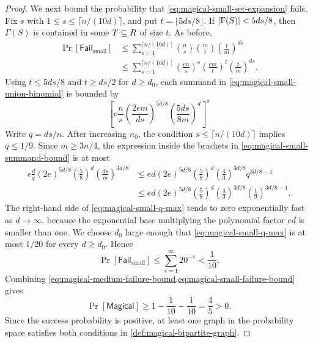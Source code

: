 \begin{proof}
	We next bound the probability that \cref{eq:magical-small-set-expansion} fails. Fix \(s\) with \(1\leq s\leq \lceil n/(10d)\rceil\), and put \(t=\lfloor 5ds/8\rfloor\). If \(\lvert\Gamma(S)\rvert<5ds/8\), then \(\Gamma(S)\) is contained in some \(T\subseteq R\) of size \(t\). As before,
	\begin{align}
		\Pr[\mathsf{Fail}_{\mathrm{small}}]
		 & \leq \sum_{s=1}^{\lceil n/(10d)\rceil}\binom{n}{s}\binom{m}{t}\left(\frac{t}{m}\right)^{ds} \label{eq:magical-small-union-raw}                                     \\
		 & \leq \sum_{s=1}^{\lceil n/(10d)\rceil}\left(\frac{en}{s}\right)^s\left(\frac{em}{t}\right)^t\left(\frac{t}{m}\right)^{ds}. \label{eq:magical-small-union-binomial}
	\end{align}
	Using \(t\leq 5ds/8\) and \(t\geq ds/2\) for \(d\geq d_0\), each summand in \cref{eq:magical-small-union-binomial} is bounded by
	\begin{equation}
		\label{eq:magical-small-summand-bound}
		\left[
			e\frac{n}{s}
			\left(\frac{2em}{ds}\right)^{5d/8}
			\left(\frac{5ds}{8m}\right)^d
			\right]^s
	\end{equation}
	Write \(q=ds/n\). After increasing \(n_0\), the condition \(s\leq\lceil n/(10d)\rceil\) implies \(q\leq 1/9\). Since \(m\geq 3n/4\), the expression inside the brackets in \cref{eq:magical-small-summand-bound} is at most
	\begin{align}
		e\frac{d}{q}
		 (2e)^{5d/8}
		\left(\frac{5}{8}\right)^d
		\left(\frac{ds}{m}\right)^{3d/8}
		 & \leq e d
			          (2e)^{5d/8}
		\left(\frac{5}{8}\right)^d
		\left(\frac{4}{3}\right)^{3d/8}
		q^{3d/8-1} \label{eq:magical-small-q-bound} \\
		 & \leq e d
			          (2e)^{5d/8}
		\left(\frac{5}{8}\right)^d
		\left(\frac{4}{3}\right)^{3d/8}
		\left(\frac{1}{9}\right)^{3d/8-1}. \label{eq:magical-small-q-max}
	\end{align}
	The right-hand side of \cref{eq:magical-small-q-max} tends to zero exponentially fast as \(d\to\infty\), because the exponential base multiplying the polynomial factor \(ed\) is smaller than one. We choose \(d_0\) large enough that \cref{eq:magical-small-q-max} is at most \(1/20\) for every \(d\geq d_0\). Hence
	\begin{equation}
		\label{eq:magical-small-failure-bound}
		\Pr[\mathsf{Fail}_{\mathrm{small}}]
		\leq \sum_{s=1}^{\infty}20^{-s}<\frac{1}{10}.
	\end{equation}
	Combining \cref{eq:magical-medium-failure-bound,eq:magical-small-failure-bound} gives
	\begin{equation}
		\label{eq:magical-success-probability}
		\Pr[\mathsf{Magical}]
		\geq 1-\frac{1}{10}-\frac{1}{10}
		=\frac{4}{5}>0.
	\end{equation}
	Since the success probability is positive, at least one graph in the probability space satisfies both conditions in \cref{def:magical-bipartite-graph}.
\end{proof}

